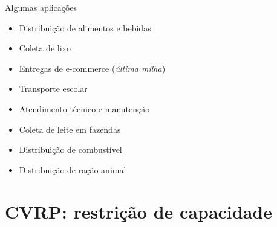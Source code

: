 \documentclass[aspectratio=169,xcolor=table]{beamer}
\begin{document}
\begin{frame}{Algumas aplicações}
  \begin{itemize}
    \item Distribuição de alimentos e bebidas \cite{ostermeier2021multi,polat2026enhanced}
    \item Coleta de lixo \cite{archetti2008split,ostermeier2021multi}
    \item Entregas de e-commerce (\emph{última milha}) \cite{aghaabdollahian2026overview}
    \item Transporte escolar \cite{gu2024multiple}
    \item Atendimento técnico e manutenção \cite{aghaabdollahian2026overview}
    \item Coleta de leite em fazendas \cite{alinaghian2018multi,gu2024multiple}
    \item Distribuição de combustível \cite{androutsopoulos2024fuel,baptista2024exact}
    \item Distribuição de ração animal \cite{archetti2008split,ostermeier2021multi}
  \end{itemize}
\end{frame}

\section{CVRP: restrição de capacidade}
\end{document}
